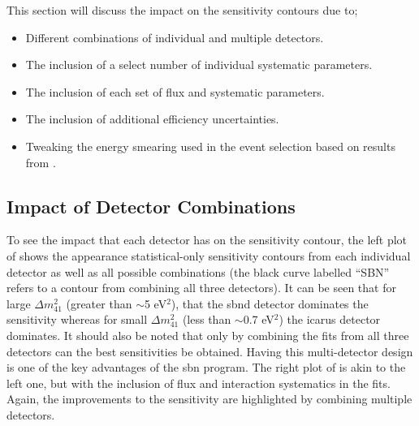 This section will discuss the impact on the sensitivity contours due to;
\begin{itemize}
    \item Different combinations of individual and multiple detectors.
    \item The inclusion of a select number of individual systematic parameters. 
    \item The inclusion of each set of flux and systematic parameters.
    \item The inclusion of additional efficiency uncertainties.
    \item Tweaking the energy smearing used in the event selection based on results from .
\end{itemize}

\subsection{Impact of Detector Combinations}

To see the impact that each detector has on the sensitivity contour, the left plot of  shows the \nue appearance statistical-only sensitivity contours from each individual detector as well as all possible combinations (the black curve labelled ``SBN'' refers to a contour from combining all three detectors). It can be seen that for large $\Delta m^2_{41}$ (greater than $\sim$5 eV$^2$), that the \gls{sbnd} detector dominates the sensitivity whereas for small $\Delta m^2_{41}$ (less than $\sim$0.7 eV$^2$) the \gls{icarus} detector dominates. It should also be noted that only by combining the fits from all three detectors can the best sensitivities be obtained. Having this multi-detector design is one of the key advantages of the \gls{sbn} program. The right plot of  is akin to the left one, but with the inclusion of flux and interaction systematics in the fits. Again, the improvements to the sensitivity are highlighted by combining multiple detectors. 

